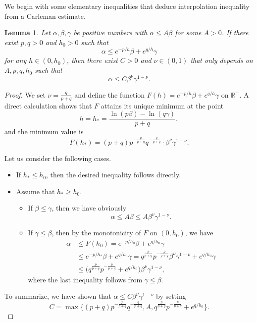\documentclass[12pt, reqno]{amsart}
\theoremstyle{plain}%
\newtheorem{lemma}[theorem]{Lemma}
\theoremstyle{definition}
\theoremstyle{remark}
\numberwithin{equation}{section}
\newcommand{\R}{\mathbb{R}}
\begin{document}
We begin with some elementary inequalities that deduce interpolation inequality from a Carleman estimate.
\begin{lemma}\label{lemma:interpolation}
	Let $\alpha,\beta,\gamma$ be positive numbers with $\alpha\leq A\beta$ for some $A>0$. If there exist $p,q>0$ and $h_0>0$ such that
	$$\alpha\leq e^{-p/h}\beta+e^{q/h}\gamma$$
	for any $h\in(0,h_0)$, then there exist $C>0$ and $\nu\in(0,1)$ that only depends on $A,p,q,h_0$ such that
	$$\alpha\leq C\beta^\nu\gamma^{1-\nu}.$$
\end{lemma}
\begin{proof}
	We set $\nu=\frac{q}{p+q}$ and  define the function $F(h)=e^{-p/h}\beta+e^{q/h}\gamma$ on $\R^+$. A direct calculation shows that  $F$ attains its unique minimum at the point
	$$h=h_*=\frac{\ln(p\beta)-\ln(q\gamma)}{p+q}, $$ and the minimum value is  $$F(h_*)=(p+q)p^{-\frac{p}{p+q}}q^{-\frac{q}{p+q}}\cdot \beta^\nu\gamma^{1-\nu}.$$
	
	Let us consider the following cases.
	
	\begin{itemize}
		\item If $h_*\leq h_0$, then the desired inequality follows directly.
		
		
		\item Assume that $h_*\geq h_0$.
		
		\begin{itemize}
			\item 	If $\beta\leq\gamma$, then we have obviously 
			$$\alpha\leq A\beta\leq A\beta^\nu\gamma^{1-\nu}.$$
			
			\item  If $\gamma\leq\beta$, then by the monotonicity of $F$ on $(0,h_0)$, we have
			\begin{align*}
				\alpha&\leq F(h_0)=e^{-p/h_0}\beta+e^{q/h_0}\gamma\\
				&\leq e^{-p/h_*}\beta+e^{q/h_0}\gamma=q^{\frac{p}{p+q}}p^{-\frac{p}{p+q}}\beta^\nu\gamma^{1-\nu}+e^{q/h_0}\gamma\\
				&\leq \Big(q^{\frac{p}{p+q}}p^{-\frac{p}{p+q}}+e^{q/h_0}\Big)\beta^\nu\gamma^{1-\nu},
			\end{align*}
			where the last inequality follows from $\gamma\leq\beta$. 
		\end{itemize}
	\end{itemize}
To summarize, we have shown that $\alpha\leq C\beta^\nu\gamma^{1-\nu}$ by setting
$$C=\max\Big\{(p+q)p^{-\frac{p}{p+q}}q^{-\frac{q}{p+q}},A,q^{\frac{p}{p+q}}p^{-\frac{p}{p+q}}+e^{q/h_0}\Big\}.$$

\end{proof}
\end{document}
